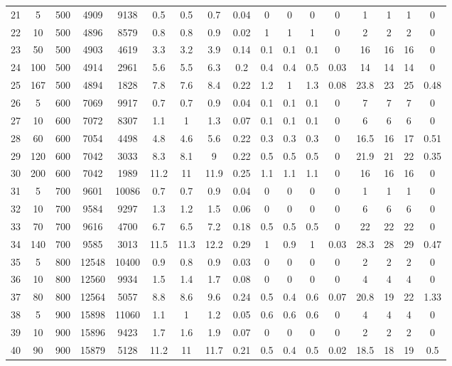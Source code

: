 \documentclass[11pt]{article}
\begin{document}
\begin{appendices}
\begin{landscape}
\begin{longtable}[c]{ccccc|cccc|cccc|cccc}
				\rowcolor[HTML]{EFEFEF} 
				21 & 5 & 500 & 4909 & 9138 & 0.5 & 0.5 & 0.7 & 0.04 & \cellcolor[HTML]{EFEFEF}0 & 0 & 0 & 0 &1 & 1 & 1 & 0 \\
				\rowcolor[HTML]{EFEFEF} 
				22 & 10 & 500 & 4896 & 8579 & 0.8 & 0.8 & 0.9 & 0.02 & 1 & 1 & 1 & 0 & 2 & 2 & 2 & 0 \\
				\rowcolor[HTML]{EFEFEF} 
				23 & 50 & 500 & 4903 & 4619 & 3.3 & 3.2 & 3.9 & 0.14 & 0.1 & 0.1 & 0.1 & 0 & 16 & 16 & 16 & 0 \\
				\rowcolor[HTML]{EFEFEF} 
				24 & 100 & 500 & 4914 & 2961 & 5.6 & 5.5 & 6.3 & 0.2 & 0.4 & 0.4 & 0.5 & 0.03 & 14 & 14 & 14 & 0 \\
				\rowcolor[HTML]{EFEFEF} 
				25 & 167 & 500 & 4894 & 1828 & 7.8 & 7.6 & 8.4 & 0.22 & 1.2 & 1 & 1.3 & 0.08 & 23.8 & 23 & 25 & 0.48 \\
				26 & 5 & 600 & 7069 & 9917 & 0.7 & 0.7 & 0.9 & 0.04 & 0.1 & 0.1 & 0.1 & 0 & 7 & 7 & 7 & 0 \\
				27 & 10 & 600 & 7072 & 8307 & 1.1 & 1 & 1.3 & 0.07 & 0.1 & 0.1 & 0.1 & 0 & 6 & 6 & 6 & 0 \\
				28 & 60 & 600 & 7054 & 4498 & 4.8 & 4.6 & 5.6 & 0.22 & 0.3 & 0.3 & 0.3 & 0 & 16.5 & 16 & 17 & 0.51 \\
				29 & 120 & 600 & 7042 & 3033 & 8.3 & 8.1 & 9 & 0.22 & 0.5 & 0.5 & 0.5 & 0 & 21.9 & 21 & 22 & 0.35 \\
				30 & 200 & 600 & 7042 & 1989 & 11.2 & 11 & 11.9 & 0.25 & 1.1 & 1.1 & 1.1 & 0 & 16 & 16 & 16 & 0 \\
				\rowcolor[HTML]{EFEFEF} 
				31 & 5 & 700 & 9601 & 10086 & 0.7 & 0.7 & 0.9 & 0.04 & 0 & 0 & 0 & 0 & 1 & 1 & 1 & 0 \\
				\rowcolor[HTML]{EFEFEF} 
				32 & 10 & 700 & 9584 & 9297 & 1.3 & 1.2 & 1.5 & 0.06 & 0 & 0 & 0 & 0 & 6 & 6 & 6 & 0 \\
				\rowcolor[HTML]{EFEFEF} 
				33 & 70 & 700 & 9616 & 4700 & 6.7 & 6.5 & 7.2 & 0.18 & 0.5 & 0.5 & 0.5 & 0 & 22 & 22 & 22 & 0 \\
				\rowcolor[HTML]{EFEFEF} 
				34 & 140 & 700 & 9585 & 3013 & 11.5 & 11.3 & 12.2 & 0.29 & 1 & 0.9 & 1 & 0.03 & 28.3 & 28 & 29 & 0.47 \\
				35 & 5 & 800 & 12548 & 10400 & 0.9 & 0.8 & 0.9 & 0.03 & 0 & 0 & 0 & 0 & 2 & 2 & 2 & 0 \\
				36 & 10 & 800 & 12560 & 9934 & 1.5 & 1.4 & 1.7 & 0.08 & 0 & 0 & 0 & 0 & 4 & 4 & 4 & 0 \\
				37 & 80 & 800 & 12564 & 5057 & 8.8 & 8.6 & 9.6 & 0.24 & 0.5 & 0.4 & 0.6 & 0.07 & 20.8 & 19 & 22 & 1.33 \\
				\rowcolor[HTML]{EFEFEF} 
				38 & 5 & 900 & 15898 & 11060 & 1.1 & 1 & 1.2 & 0.05 & 0.6 & 0.6 & 0.6 & 0 & 4 & 4 & 4 & 0 \\
				\rowcolor[HTML]{EFEFEF} 
				39 & 10 & 900 & 15896 & 9423 & 1.7 & 1.6 & 1.9 & 0.07 & 0 & 0 & 0 & 0 & 2 & 2 & 2 & 0 \\
				\rowcolor[HTML]{EFEFEF} 
				40 & 90 & 900 & 15879 & 5128 & 11.2 & 11 & 11.7 & 0.21 & 0.5 & 0.4 & 0.5 & 0.02 & 18.5 & 18 & 19 & 0.5
			\end{longtable}
		\end{landscape}
		

\end{appendices}
\end{document}
